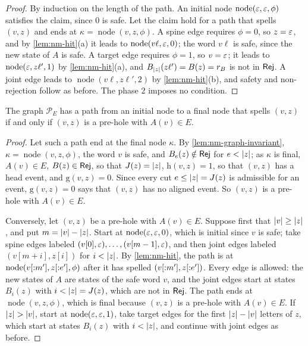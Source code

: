 \begin{proof}
By induction on the length of the path. An initial node $\operatorname{node}(\varepsilon,\varepsilon,\phi)$
satisfies the claim, since $0$ is safe. Let the claim hold for a path that
spells $(v,z)$ and ends at $\kappa=\operatorname{node}(v,z,\phi)$. A spine edge requires
$\phi=0$, so $z=\varepsilon$, and by \cref{lem:nm-hit}(a) it leads to
$\operatorname{node}(v\ell,\varepsilon,0)$; the word $v\ell$ is safe, since the new state of $A$ is
safe. A target edge requires $\phi=1$, so $v=\varepsilon$; it leads to
$\operatorname{node}(\varepsilon,z\ell',1)$ by \cref{lem:nm-hit}(a), and $B_{\lvert z\rvert}(z\ell')=B(z)=r_B$ is
not in $\mathsf{Rej}$. A joint edge leads to $\operatorname{node}(v\ell,z\ell',2)$ by
\cref{lem:nm-hit}(b), and safety and non-rejection follow as before. The phase
$2$ imposes no condition.
\end{proof}

\begin{lemma}\label{lem:nm-graph-correct}
The graph $\mathcal P_E$ has a path from an initial node to a final node that
spells $(v,z)$ if and only if $(v,z)$ is a pre-hole with $A(v)\in E$.
\end{lemma}

\begin{proof}
Let such a path end at the final node $\kappa$. By
\cref{lem:nm-graph-invariant}, $\kappa=\operatorname{node}(v,z,\phi)$, the word $v$ is safe,
and $B_e(z)\notin\mathsf{Rej}$ for $e<\lvert z\rvert$; as $\kappa$ is final, $A(v)\in E$,
$B(z)\in\mathsf{Rej}$, so that $J(z)=\lvert z\rvert$, $\mathrm h(v,z)=1$, so that $(v,z)$ has a
head event, and $\mathrm g(v,z)=0$. Since every cut $e\le\lvert z\rvert=J(z)$ is
admissible for an event, $\mathrm g(v,z)=0$ says that $(v,z)$ has no aligned
event. So $(v,z)$ is a pre-hole with $A(v)\in E$.

Conversely, let $(v,z)$ be a pre-hole with $A(v)\in E$. Suppose first that
$\lvert v\rvert\ge\lvert z\rvert$, and put $m=\lvert v\rvert-\lvert z\rvert$. Start at $\operatorname{node}(\varepsilon,\varepsilon,0)$, which
is initial since $v$ is safe; take spine edges labeled
$(v[0],\varepsilon),\dots,(v[m-1],\varepsilon)$, and then joint edges labeled
$(v[m+i],z[i])$ for $i<\lvert z\rvert$. By \cref{lem:nm-hit}, the path is at
$\operatorname{node}(v[{:}m'],z[{:}e'],\phi)$ after it has spelled
$(v[{:}m'],z[{:}e'])$. Every edge is allowed: the new states of $A$ are
states of the safe word $v$, and the joint edges start at states $B_i(z)$ with
$i<\lvert z\rvert=J(z)$, which are not in $\mathsf{Rej}$. The path ends at $\operatorname{node}(v,z,\phi)$,
which is final because $(v,z)$ is a pre-hole with $A(v)\in E$. If
$\lvert z\rvert>\lvert v\rvert$, start at $\operatorname{node}(\varepsilon,\varepsilon,1)$, take target edges for the first
$\lvert z\rvert-\lvert v\rvert$ letters of $z$, which start at states $B_i(z)$ with
$i<\lvert z\rvert$, and continue with joint edges as before.
\end{proof}


